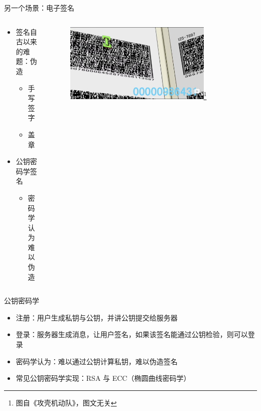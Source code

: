 \documentclass[aspectratio=169]{ctexbeamer}
\begin{document}
\begin{frame}{另一个场景：电子签名}
  \begin{columns}
    \begin{column}{0.4\textwidth}
      \begin{itemize}
        \item 签名自古以来的难题：伪造
        \begin{itemize}
          \item 手写签字
          \item 盖章
        \end{itemize}
        \item 公钥密码学签名\begin{itemize}
          \item 密码学认为难以伪造
        \end{itemize}
      \end{itemize}
    \end{column}
    \begin{column}{0.6\textwidth}
      \begin{figure}
        \centering
        \includegraphics[width=0.8\textwidth]{img/base64.jpg}\footnote{图自《攻壳机动队》，图文无关}
      \end{figure}
    \end{column}
  \end{columns}
\end{frame}

\begin{frame}{公钥密码学}
  \begin{center}
  \end{center}
  \begin{itemize}
    \item<1-> 注册：用户生成私钥与公钥，并讲公钥提交给服务器
    \item<2-> 登录：服务器生成消息，让用户签名，如果该签名能通过公钥检验，则可以登录
    \item<3-> 密码学认为：难以通过公钥计算私钥，难以伪造签名
    \item<3-> 常见公钥密码学实现：RSA 与 ECC（椭圆曲线密码学） %
  \end{itemize}
\end{frame}
\end{document}
